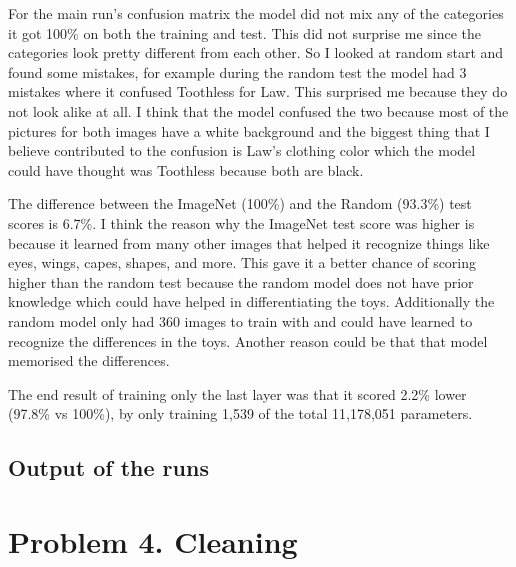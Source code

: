 \documentclass[11pt]{article}
\begin{document}
\begin{center}\end{center}

For the main run's confusion matrix the model did not mix any of the
categories it got 100\% on both the training and test. This did not surprise me
since the categories look pretty different from each other. So I looked at
random start and found some mistakes, for example during the random test the
model had 3 mistakes where it confused Toothless for Law. This surprised me
because they do not look alike at all. I think that the model confused the two
because most of the pictures for both images have a white background and the
biggest thing that I believe contributed to the confusion is Law's clothing
color which the model could have thought was Toothless because both are black.

\begin{center}\end{center}

The difference between the ImageNet (100\%) and the Random (93.3\%) test scores
is 6.7\%. I think the reason why the ImageNet test score was higher is because
it learned from many other images that helped it recognize things like eyes,
wings, capes, shapes, and more. This gave it a better chance of scoring higher
than the random test because the random model does not have prior knowledge
which could have helped in differentiating the toys. Additionally the random
model only had 360 images to train with and could have learned to recognize the
differences in the toys. Another reason could be that that model memorised the
differences.

The end result of training only the last layer was that it scored 2.2\% lower
(97.8\% vs 100\%), by only training 1,539 of the total 11,178,051 parameters.

\subsection*{Output of the runs}

\section*{Problem 4. Cleaning}
\end{document}
